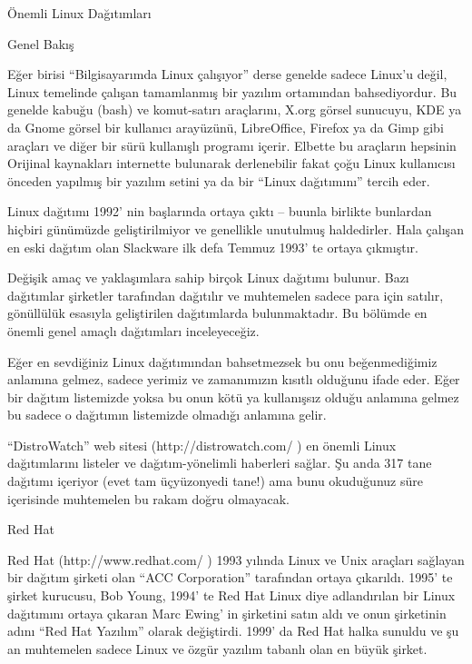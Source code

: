 \begin{section}{Önemli Linux Dağıtımları}
\begin{subsection}{Genel Bakış}

Eğer birisi “Bilgisayarımda Linux çalışıyor” derse genelde sadece Linux'u değil, Linux temelinde çalışan tamamlanmış bir yazılım ortamından bahsediyordur. Bu genelde kabuğu (bash) ve komut-satırı araçlarını, X.org görsel sunucuyu, KDE ya da Gnome görsel bir kullanıcı arayüzünü, LibreOffice, Firefox ya da Gimp gibi araçları ve diğer bir sürü kullanışlı programı içerir. Elbette bu araçların hepsinin Orijinal kaynakları internette bulunarak derlenebilir fakat çoğu Linux kullanıcısı önceden yapılmış bir yazılım setini ya da bir “Linux dağıtımını” tercih eder.

Linux dağıtımı 1992' nin başlarında ortaya çıktı -- buunla birlikte bunlardan hiçbiri günümüzde geliştirilmiyor ve genellikle unutulmuş haldedirler. Hala çalışan en eski dağıtım olan Slackware ilk defa Temmuz 1993' te ortaya çıkmıştır.

Değişik amaç ve yaklaşımlara sahip birçok Linux dağıtımı bulunur. Bazı dağıtımlar şirketler tarafından dağıtılır ve muhtemelen sadece para için satılır, gönüllülük esasıyla geliştirilen dağıtımlarda bulunmaktadır. Bu bölümde en önemli genel amaçlı dağıtımları inceleyeceğiz.

Eğer en sevdiğiniz Linux dağıtımından bahsetmezsek bu onu beğenmediğimiz anlamına gelmez, sadece yerimiz ve zamanımızın kısıtlı olduğunu ifade eder. Eğer bir dağıtım listemizde yoksa bu onun kötü ya kullanışsız olduğu anlamına gelmez bu sadece o dağıtımın listemizde olmadığı anlamına gelir.

“DistroWatch” web sitesi (http://distrowatch.com/ ) en önemli Linux dağıtımlarını listeler ve dağıtım-yönelimli haberleri sağlar. Şu anda 317 tane dağıtımı içeriyor (evet tam üçyüzonyedi tane!) ama bunu okuduğunuz süre içerisinde muhtemelen bu rakam doğru olmayacak.
\end{subsection}
\begin{subsection}{Red Hat}

Red Hat (http://www.redhat.com/ ) 1993 yılında Linux ve Unix araçları sağlayan bir dağıtım şirketi olan “ACC Corporation” tarafından ortaya çıkarıldı. 1995' te şirket kurucusu, Bob Young, 1994' te Red Hat Linux diye adlandırılan bir Linux dağıtımını ortaya çıkaran Marc Ewing' in şirketini satın aldı ve onun şirketinin adını “Red Hat Yazılım” olarak değiştirdi. 1999' da Red Hat halka sunuldu ve şu an muhtemelen sadece Linux ve özgür yazılım tabanlı olan en büyük şirket.


\end{subsection}
\end{section}
